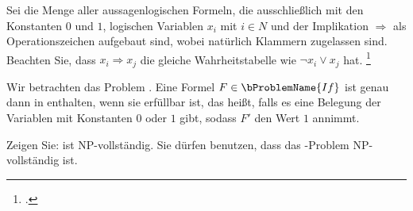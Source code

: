 \documentclass{bschlangaul-aufgabe}
\begin{document}

Sei  die Menge aller aussagenlogischen Formeln, die
ausschließlich mit den Konstanten $0$ und $1$, logischen Variablen $x_i$
mit $i \in N$ und der Implikation $\Rightarrow$ als Operationszeichen
aufgebaut sind, wobei natürlich Klammern zugelassen sind. Beachten Sie,
dass $x_i \Rightarrow x_j$ die gleiche Wahrheitstabelle wie $\neg x_i
\lor x_j$ hat.
\footcite{examen:66115:2020:09}

Wir betrachten das Problem . Eine Formel $F \in
\bProblemName{If}$ ist genau dann in  enthalten,
wenn sie erfüllbar ist, das heißt, falls es eine Belegung der Variablen
mit Konstanten $0$ oder $1$ gibt, sodass $F'$ den Wert $1$ annimmt.

Zeigen Sie:  ist NP-vollständig. Sie dürfen
benutzen, dass das -Problem NP-vollständig ist.

\begin{bAntwort}
\bMetaNochKeineLoesung
\end{bAntwort}
\end{document}
